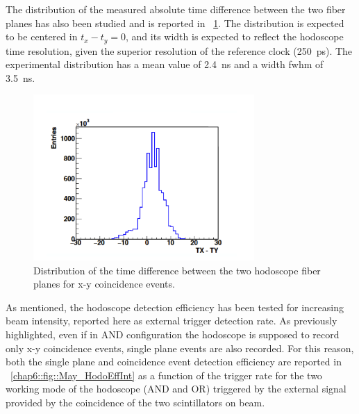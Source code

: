 The distribution of the measured absolute time difference between the two fiber planes has also been studied and is reported in \figurename~\ref{chap6::fig::May_HodoDeltaTFibers}. The distribution is expected to be centered in $t_{x}-t_{y} = 0$, and its width is expected to reflect the hodoscope time resolution, given the superior resolution of the reference clock (250~ps). The experimental distribution has a mean value of 2.4~ns and a width \gls{fwhm} of 3.5~ns.

\begin{figure}[!htbp]
\centering
\includegraphics[width=0.75\textwidth]{03_GraphicFiles/chapter6_BeamTests/Nice_May2018/TX-TY.png}
\caption{Distribution of the time difference between the two hodoscope fiber planes for x-y coincidence events.}
\label{chap6::fig::May_HodoDeltaTFibers}
\end{figure}

As mentioned, the hodoscope detection efficiency has been tested for increasing beam intensity, reported here as external trigger detection rate. As previously highlighted, even if in AND configuration the hodoscope is supposed to record only x-y coincidence events, single plane events are also recorded. For this reason, both the single plane and coincidence event detection efficiency are reported in \figurename~\ref{chap6::fig::May_HodoEffInt} as a function of the trigger rate for the two working mode of the hodoscope (AND and OR) triggered by the external signal provided by the coincidence of the two scintillators on beam. 

